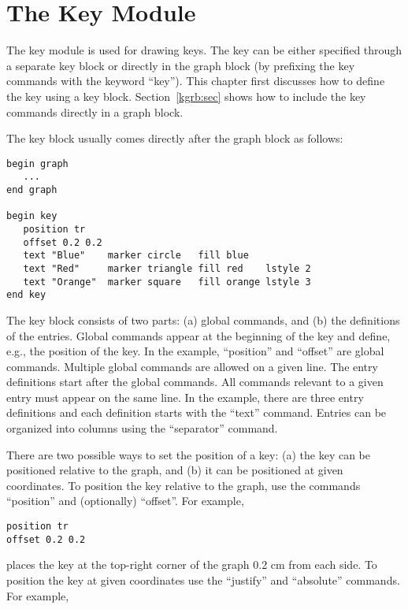 \chapter{The Key Module}
\label{key:chap}

The key module is used for drawing keys. The key can be either specified through a separate key block or directly in the graph block (by prefixing the key commands with the keyword ``key''). This chapter first discusses how to define the key using a key block. Section~\ref{kgrb:sec} shows how to include the key commands directly in a graph block.

The key block usually comes directly after the graph block as follows:

\preglecode{}
\begin{Verbatim}
begin graph
   ...
end graph

begin key 
   position tr
   offset 0.2 0.2
   text "Blue"    marker circle   fill blue
   text "Red"     marker triangle fill red    lstyle 2
   text "Orange"  marker square   fill orange lstyle 3
end key
\end{Verbatim}
\postglecode{}
\mbox{}

The key block consists of two parts: (a) global commands, and (b) the definitions of the entries. Global commands appear at the beginning of the key and define, e.g., the position of the key. In the example, ``position'' and ``offset'' are global commands. Multiple global commands are allowed on a given line. The entry definitions start after the global commands. All commands relevant to a given entry must appear on the same line. In the example, there are three entry definitions and each definition starts with the ``text'' command. Entries can be organized into columns using the ``separator'' command.

There are two possible ways to set the position of a key: (a) the key can be positioned relative to the graph, and (b) it can be positioned at given coordinates. To position the key relative to the graph, use the commands ``position'' and (optionally) ``offset''. For example,

\preglecode{}
\begin{Verbatim}
position tr
offset 0.2 0.2
\end{Verbatim}
\postglecode{}

\noindent{}places the key at the top-right corner of the graph 0.2 cm from each side. To position the key at given coordinates use the ``justify'' and ``absolute'' commands. For example,

